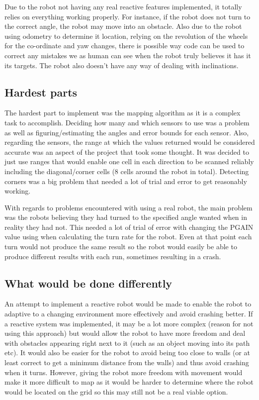 \documentclass[a4paper,12pt]{article}
\begin{document}
\vspace{5mm}
\noindent Due to the robot not having any real reactive features implemented, it totally relies on everything working properly. For instance, if the robot does not turn to the correct angle, the robot may move into an obstacle. Also due to the robot using odometry to determine it location, relying on the revolution of the wheels for the co-ordinate and yaw changes, there is possible way code can be used to correct any mistakes we as human can see when the robot truly believes it has it its targets. The robot also doesn't have any way of dealing with inclinations.

\subsection{Hardest parts}
\noindent The hardest part to implement was the mapping algorithm as it is a complex task to accomplish. Deciding how many and which sensors to use was a problem as well as figuring/estimating the angles and error bounds for each sensor. Also, regarding the sensors, the range at which the values returned would be considered accurate was an aspect of the project that took some thought. It was decided to just use ranges that would enable one cell in each direction to be scanned reliably including the diagonal/corner cells (8 cells around the robot in total). Detecting corners was a big problem that needed a lot of trial and error to get reasonably working.

\vspace{5mm}
\noindent With regards to problems encountered with using a real robot, the main problem was the robots believing they had turned to the specified angle wanted when in reality they had not. This needed a lot of trial of error with changing the PGAIN value using when calculating the turn rate for the robot. Even at that point each turn would not produce the same result so the robot would easily be able to produce different results with each run, sometimes resulting in a crash.

\subsection{What would be done differently}
\noindent An attempt to implement a reactive robot would be made to enable the robot to adaptive to a changing environment more effectively and avoid crashing better. If a reactive system was implemented, it may be a lot more complex (reason for not using this approach) but would allow the robot to have more freedom and deal with obstacles appearing right next to it (such as an object moving into its path etc). It would also be easier for the robot to avoid being too close to walls (or at least correct to get a minimum distance from the walls) and thus avoid crashing when it turns. However, giving the robot more freedom with movement would make it more difficult to map as it would be harder to determine where the robot would be located on the grid so this may still not be a real viable option.
\end{document}
